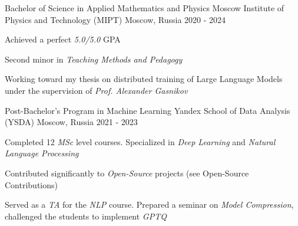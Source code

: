 
\begin{cventries}
  \cventry
    {Bachelor of Science in Applied Mathematics and Physics} %
    {Moscow Institute of Physics and Technology (MIPT)} %
    {Moscow, Russia} %
    {2020 - 2024} %
    {
        \begin{cvitems}
         \item { Achieved a perfect \textit{5.0/5.0} GPA }
         \item { Second minor in \textit{Teaching Methods and Pedagogy} }
         \item { Working toward my thesis on distributed training of Large Language Models under the supervision of \textit{Prof. Alexander Gasnikov} }
        \end{cvitems}
    }
    
  \cventry
    {Post-Bachelor's Program in Machine Learning} %
    {Yandex School of Data Analysis (YSDA)}
    {Moscow, Russia}
    {2021 - 2023}
    {
      \begin{cvitems} %
        \item { Completed 12 \textit{MSc} level courses. Specialized in \textit{Deep Learning} and \textit{Natural Language Processing} }
        \item { Contributed significantly to \textit{Open-Source} projects (see Open-Source Contributions)}
        \item { Served as a \textit{TA} for the \textit{NLP} course. Prepared a seminar on \textit{Model Compression}, challenged the students to implement \textit{GPTQ} }
      \end{cvitems}
    }
\end{cventries}
